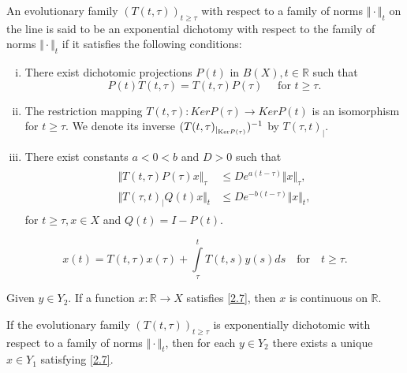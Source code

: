 \documentclass[10pt,a4paper]{amsart}
\def\r{\mathbb{R}}
\begin{document}
\begin{definition}
An evolutionary family $\left( T(t,\tau)\right)_{t \geq \tau}$ with respect to a family of norms $\Vert \cdot\Vert _t$ on the line is said to be an exponential dichotomy with respect to the family of norms $\Vert \cdot\Vert _t$ if it satisfies the following conditions:
\begin{enumerate}[i.]
\item There exist dichotomic projections $P(t)$ in $B(X), t \in \mathbb{R}$ such that 
\begin{equation*}
P(t)T(t,\tau)=T(t,\tau)P(\tau) \quad \text{ for } t\geq \tau. 
\end{equation*}
\item The restriction mapping  
$T(t,\tau): Ker P(\tau) \rightarrow Ker P(t) $
is an isomorphism for $t \geq \tau$. We denote its inverse $(T(t,\tau)_{|_{\text{\rm Ker}P(\tau)}})^{-1}$ by $T(\tau,t)_|$.
\item There exist constants $a<0<b$ and $D>0$ such that
\begin{align}
\begin{split}
\Vert T(t,\tau)P(\tau)x \Vert _{\tau} &\leq De^{a(t-\tau)}\Vert x\Vert _{\tau},\\
\Vert T(\tau,t)_| Q(t)x \Vert _{t} &\leq De^{-b(t-\tau)}\Vert x\Vert _{t},
\end{split} \label{2.6}
\end{align}
for $t \geq \tau, x\in X$ and $Q(t)=I-P(t)$.
\end{enumerate}
\end{definition}

\begin{equation}
x(t)=T(t,\tau)x(\tau)+\displaystyle\int\limits_{\tau}^{t}T(t,s)y(s)ds  \quad  \text{for} \quad t\geq \tau. \label{2.7}
\end{equation}

\begin{lemma}\label{lem1}
Given $y\in Y_2$. If a function $x: \r \to X$ satisfies \eqref{2.7}, then $x$ is continuous on $\r$.
\end{lemma}

\begin{theorem}\label{thm:2.2}
If the evolutionary family $(T(t,\tau))_{t \geq \tau}$ is exponentially dichotomic with respect to a family of norms $\Vert \cdot\Vert _t$, then for each $y \in Y_2$ there exists a unique $x \in Y_1$ satisfying \eqref{2.7}.
\end{theorem}
\end{document}
